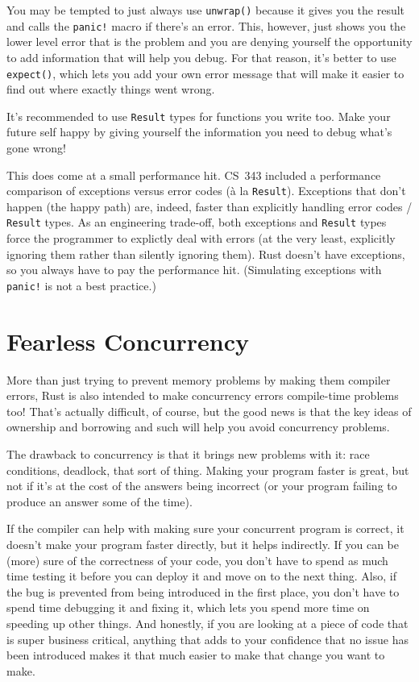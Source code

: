 You may be tempted to just always use \texttt{unwrap()} because it gives you the result and calls the \texttt{panic!} macro if there's an error. This, however, just shows you the lower level error that is the problem and you are denying yourself the opportunity to add information that will help you debug. For that reason, it's better to use \texttt{expect()}, which lets you add your own error message that will make it easier to find out where exactly things went wrong.

It's recommended to use \texttt{Result} types for functions you write too. Make your future self happy by giving yourself the information you need to debug what's gone wrong!

This does come at a small performance hit. CS~343 included a performance comparison of exceptions versus error codes (\`a la \texttt{Result}). Exceptions that don't happen (the happy path) are, indeed, faster than explicitly handling error codes / \texttt{Result} types. As an engineering trade-off, both exceptions and \texttt{Result} types force the programmer to explictly deal with errors (at the very least, explicitly ignoring them rather than silently ignoring them). Rust doesn't have exceptions, so you always have to pay the performance hit. (Simulating exceptions with \texttt{panic!} is not a best practice.)

\section*{Fearless Concurrency}
More than just trying to prevent memory problems by making them compiler errors, Rust is also intended to make concurrency errors compile-time problems too! That's actually difficult, of course, but the good news is that the key ideas of ownership and borrowing and such will help you avoid concurrency problems.

The drawback to concurrency is that it brings new problems with it: race conditions, deadlock, that sort of thing. Making your program faster is great, but not if it's at the cost of the answers being incorrect (or your program failing to produce an answer some of the time).

If the compiler can help with making sure your concurrent program is correct, it doesn't make your program faster directly, but it helps indirectly. If you can be (more) sure of the correctness of your code, you don't have to spend as much time testing it before you can deploy it and move on to the next thing. Also, if the bug is prevented from being introduced in the first place, you don't have to spend time debugging it and fixing it, which lets you spend more time on speeding up other things. And honestly, if you are looking at a piece of code that is super business critical, anything that adds to your confidence that no issue has been introduced makes it that much easier to make that change you want to make.

